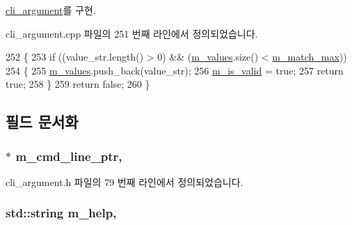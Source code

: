 \hyperlink{classcli__argument_a3fca6420b74bdd67ab37a11d86868800}{cli\+\_\+argument}를 구현.



cli\+\_\+argument.\+cpp 파일의 251 번째 라인에서 정의되었습니다.


\begin{DoxyCode}
252 \{
253     \textcolor{keywordflow}{if} ((value\_str.length() > 0) && (\hyperlink{classcli__argument__string_a698dcbe3063b2cb63a77b9973fb18dcf}{m\_values}.size() < \hyperlink{classcli__argument_a6f9fd009acee86b73a9f1b8e80a95b43}{m\_match\_max}))
254     \{
255         \hyperlink{classcli__argument__string_a698dcbe3063b2cb63a77b9973fb18dcf}{m\_values}.push\_back(value\_str);
256         \hyperlink{classcli__argument_a3163252d457c8ef3a286a8538d7e319f}{m\_is\_valid} = \textcolor{keyword}{true};
257         \textcolor{keywordflow}{return} \textcolor{keyword}{true};
258     \}
259     \textcolor{keywordflow}{return} \textcolor{keyword}{false};
260 \}
\end{DoxyCode}


\subsection{필드 문서화}
\subsubsection[{\texorpdfstring{m\+\_\+cmd\+\_\+line\+\_\+ptr}{m_cmd_line_ptr}}]{$\ast$ m\+\_\+cmd\+\_\+line\+\_\+ptr\hspace{0.3cm}{\ttfamily [protected]}, {\ttfamily [inherited]}}\hypertarget{classcli__argument_a802ef904236d4228f1b8edb3a96eb9cd}{}\label{classcli__argument_a802ef904236d4228f1b8edb3a96eb9cd}


cli\+\_\+argument.\+h 파일의 79 번째 라인에서 정의되었습니다.

\subsubsection[{\texorpdfstring{m\+\_\+help}{m_help}}]{\setlength{\rightskip}{0pt plus 5cm}std\+::string m\+\_\+help\hspace{0.3cm}{\ttfamily [protected]}, {\ttfamily [inherited]}}\hypertarget{classcli__argument_a3985971d45415a337f60ed183b445c96}{}\label{classcli__argument_a3985971d45415a337f60ed183b445c96}


